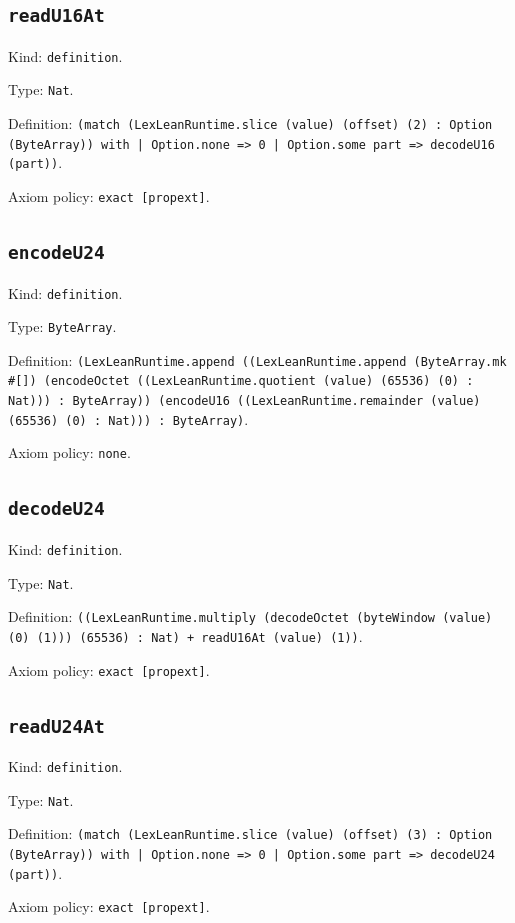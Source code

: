 \documentclass[11pt]{article}
\begin{document}
\subsection*{\texttt{readU16At}}
\noindent Kind: \texttt{definition}.\par
\noindent Type: \texttt{Nat}.\par
\noindent Definition: \texttt{(match (LexLeanRuntime.slice (value) (offset) (2) : Option (ByteArray)) with | Option.none => 0 | Option.some part => decodeU16 (part))}.\par
\noindent Axiom policy: \texttt{exact [propext]}.\par
\subsection*{\texttt{encodeU24}}
\noindent Kind: \texttt{definition}.\par
\noindent Type: \texttt{ByteArray}.\par
\noindent Definition: \texttt{(LexLeanRuntime.append ((LexLeanRuntime.append (ByteArray.mk \#[]) (encodeOctet ((LexLeanRuntime.quotient (value) (65536) (0) : Nat))) : ByteArray)) (encodeU16 ((LexLeanRuntime.remainder (value) (65536) (0) : Nat))) : ByteArray)}.\par
\noindent Axiom policy: \texttt{none}.\par
\subsection*{\texttt{decodeU24}}
\noindent Kind: \texttt{definition}.\par
\noindent Type: \texttt{Nat}.\par
\noindent Definition: \texttt{((LexLeanRuntime.multiply (decodeOctet (byteWindow (value) (0) (1))) (65536) : Nat) + readU16At (value) (1))}.\par
\noindent Axiom policy: \texttt{exact [propext]}.\par
\subsection*{\texttt{readU24At}}
\noindent Kind: \texttt{definition}.\par
\noindent Type: \texttt{Nat}.\par
\noindent Definition: \texttt{(match (LexLeanRuntime.slice (value) (offset) (3) : Option (ByteArray)) with | Option.none => 0 | Option.some part => decodeU24 (part))}.\par
\noindent Axiom policy: \texttt{exact [propext]}.\par
\end{document}
